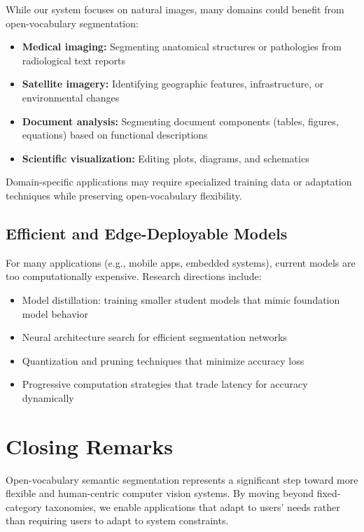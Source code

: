 While our system focuses on natural images, many domains could benefit from open-vocabulary segmentation:
\begin{itemize}
    \item \textbf{Medical imaging:} Segmenting anatomical structures or pathologies from radiological text reports
    \item \textbf{Satellite imagery:} Identifying geographic features, infrastructure, or environmental changes
    \item \textbf{Document analysis:} Segmenting document components (tables, figures, equations) based on functional descriptions
    \item \textbf{Scientific visualization:} Editing plots, diagrams, and schematics
\end{itemize}

Domain-specific applications may require specialized training data or adaptation techniques while preserving open-vocabulary flexibility.

\subsection{Efficient and Edge-Deployable Models}

For many applications (e.g., mobile apps, embedded systems), current models are too computationally expensive. Research directions include:
\begin{itemize}
    \item Model distillation: training smaller student models that mimic foundation model behavior
    \item Neural architecture search for efficient segmentation networks
    \item Quantization and pruning techniques that minimize accuracy loss
    \item Progressive computation strategies that trade latency for accuracy dynamically
\end{itemize}

\section{Closing Remarks}

Open-vocabulary semantic segmentation represents a significant step toward more flexible and human-centric computer vision systems. By moving beyond fixed-category taxonomies, we enable applications that adapt to users' needs rather than requiring users to adapt to system constraints.

